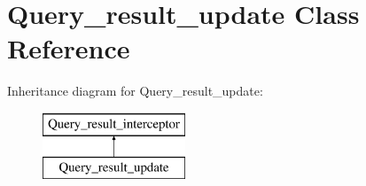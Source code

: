 \hypertarget{classQuery__result__update}{}\section{Query\+\_\+result\+\_\+update Class Reference}
\label{classQuery__result__update}
Inheritance diagram for Query\+\_\+result\+\_\+update\+:\begin{figure}[H]
\begin{center}
\leavevmode
\includegraphics[height=2.000000cm]{classQuery__result__update}
\end{center}
\end{figure}
